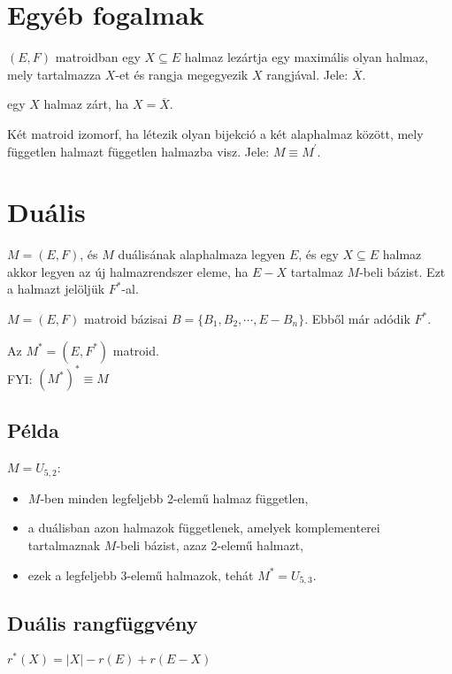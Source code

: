\section*{Egyéb fogalmak}
\begin{defn} [Lezárt]
$(E,F)$ matroidban egy $X\subseteq E$ halmaz lezártja egy maximális olyan halmaz, mely tartalmazza $X$-et és rangja megegyezik $X$ rangjával. Jele: $\overline{X}$.
\end{defn}

\begin{defn} 
egy $X$ halmaz zárt, ha $X=\overline{X}$.
\end{defn}

\begin{defn} [Izomorfia]
Két matroid izomorf, ha létezik olyan bijekció a két alaphalmaz között, mely független halmazt független halmazba visz. Jele: $M\equiv M^{'}$.
\end{defn}

\section*{Duális}
$M=(E,F)$, és $M$ duálisának alaphalmaza legyen $E$, és egy $X\subseteq E$ halmaz akkor legyen az új halmazrendszer eleme, ha $E-X$ tartalmaz $M$-beli bázist. Ezt a halmazt jelöljük $F^{*}$-al.

\begin{defn}
$M=(E,F)$ matroid bázisai $B=\lbrace B_{1},B_{2},\cdots ,E-B_{n}\rbrace$. Ebből már adódik $F^{*}$.
\end{defn}

\begin{theo}  Az $M^{*} =(E,F^{*})$ matroid.\\
FYI: $(M^{*})^{*}\equiv M$
\end{theo}

\subsection*{Példa}
$M=U_{5,2}$:
\begin{itemize}
\item $M$-ben minden legfeljebb 2-elemű halmaz független,
\item a duálisban azon halmazok függetlenek, amelyek komplementerei tartalmaznak $M$-beli bázist, azaz 2-elemű halmazt,
\item ezek a legfeljebb 3-elemű halmazok, tehát $M^{*}=U_{5,3}$.
\end{itemize}

\subsection*{Duális rangfüggvény}
$r^{*}(X)=|X|-r(E)+r(E-X)$